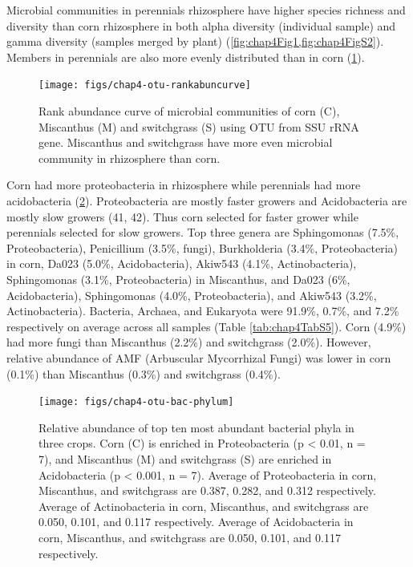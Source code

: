\documentclass[]{msu-thesis}
\begin{document}
Microbial communities in perennials rhizosphere have higher species richness and diversity than corn rhizosphere in both alpha diversity (individual sample) and gamma diversity (samples merged by plant) (\cref{fig:chap4Fig1,fig:chap4FigS2}). Members in perennials are also more evenly distributed than in corn (\cref{fig:chap4FigS3}).

\begin{figure}[tbph!]
  \centering
  \texttt{[image: figs/chap4-otu-rankabuncurve]}
  \caption[Rank abundance curve of microbial communities in rhizosphere]{Rank abundance curve of microbial communities of corn (C), Miscanthus (M) and switchgrass (S) using OTU from SSU rRNA gene. Miscanthus and switchgrass have more even microbial community in rhizosphere than corn.}
  \label{fig:chap4FigS3}
\end{figure}



Corn had more proteobacteria in rhizosphere while perennials had more acidobacteria (\cref{fig:chap4Fig2}). Proteobacteria are mostly faster growers and Acidobacteria are mostly slow growers (41, 42)\cite{fierer_toward_2007,eilers_shifts_2010}. Thus corn selected for faster grower while perennials selected for slow growers. Top three genera are Sphingomonas (7.5\%, Proteobacteria), Penicillium (3.5\%, fungi), Burkholderia (3.4\%, Proteobacteria) in corn, Da023 (5.0\%, Acidobacteria), Akiw543 (4.1\%, Actinobacteria), Sphingomonas (3.1\%, Proteobacteria) in Miscanthus, and Da023 (6\%, Acidobacteria), Sphingomonas (4.0\%, Proteobacteria), and Akiw543 (3.2\%, Actinobacteria). Bacteria, Archaea, and Eukaryota were 91.9\%, 0.7\%, and 7.2\% respectively on average across all samples (Table \ref{tab:chap4TabS5}). Corn (4.9\%) had more fungi than Miscanthus (2.2\%) and switchgrass (2.0\%). However, relative abundance of AMF (Arbuscular Mycorrhizal Fungi) was lower in corn (0.1\%) than Miscanthus (0.3\%) and switchgrass (0.4\%).


\begin{figure}[tbph!]
  \centering
  \texttt{[image: figs/chap4-otu-bac-phylum]}
  \caption[Relative abundance of top ten most abundant bacterial phyla in three crops]{Relative abundance of top ten most abundant bacterial phyla in three crops. Corn (C) is enriched in Proteobacteria (p < 0.01, n = 7), and Miscanthus (M) and switchgrass (S) are enriched in Acidobacteria (p < 0.001, n = 7). Average of Proteobacteria in corn, Miscanthus, and switchgrass are 0.387, 0.282, and 0.312 respectively. Average of Actinobacteria in corn, Miscanthus, and switchgrass are 0.050, 0.101, and 0.117 respectively. Average of Acidobacteria in corn, Miscanthus, and switchgrass are 0.050, 0.101, and 0.117 respectively.}
  \label{fig:chap4Fig2}
\end{figure}
\end{document}
